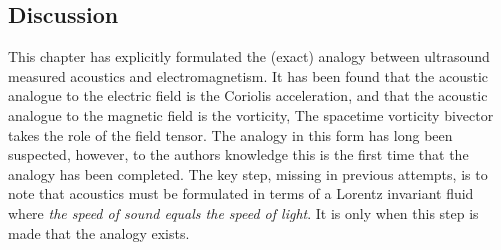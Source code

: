 \documentclass[10pt, fleqn,final,showtrims,oldfontcommands]{article} %
\newcommand{\eqnref}[1]{\ref{eqn:#1}}
\newcommand{\vB}{\vect B}
\newcommand{\vect}[1]{\mathbf{#1}}
\newcommand{\vA}{\textbf{A}}
\begin{document}




\subsection{Discussion}

This  chapter has explicitly formulated the (exact) analogy between ultrasound measured acoustics 
and electromagnetism.
It has been found that the acoustic analogue to the electric field is the Coriolis acceleration,
and that the acoustic analogue to the magnetic field is the vorticity,
The spacetime vorticity bivector takes the role of the field tensor.
The analogy in this form has long been suspected\cite{Marmanis2000,Sridhar1998},
however, to the authors knowledge this is the first time that the analogy has been  completed.
The key step, missing in previous attempts, 
is to note that acoustics must be formulated in terms of a Lorentz invariant fluid where
{\em the speed of sound equals the speed of light}.
It is only when this step is made that the analogy exists.
\end{document}
